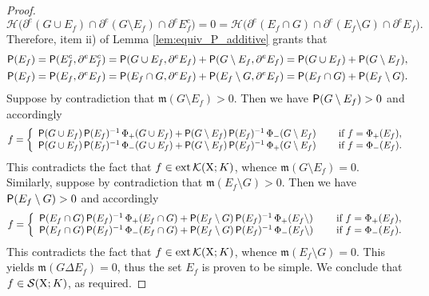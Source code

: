 \documentclass[reqno]{amsart}
\numberwithin{equation}{section}
\newcommand{\X}{{\rm X}}
\newcommand{\mm}{\mathfrak m}
\newcommand{\1}{\mathbbm 1}
\renewcommand{\P}{{\sf P}}
\renewcommand{\H}{{\mathcal H}}
\begin{document}
\begin{proof}
\[
\H\big(\partial^e(G\cup E_f)\cap\partial^e(G\setminus E_f)\cap\partial^e E_f^c\big)
=0=\H\big(\partial^e(E_f\cap G)\cap\partial^e(E_f\setminus G)\cap\partial^e E_f\big).
\]
Therefore, item ii) of Lemma \ref{lem:equiv_P_additive} grants that
\[\begin{split}
\P(E_f)&=\P(E_f^c,\partial^e E_f^c)=
\P(G\cup E_f,\partial^e E_f)+\P(G\setminus E_f,\partial^e E_f)
=\P(G\cup E_f)+\P(G\setminus E_f),\\
\P(E_f)&=\P(E_f,\partial^e E_f)=
\P(E_f\cap G,\partial^e E_f)+\P(E_f\setminus G,\partial^e E_f)
=\P(E_f\cap G)+\P(E_f\setminus G).
\end{split}\]
Suppose by contradiction that \(\mm(G\setminus E_f)>0\). Then
we have \(\P(G\setminus E_f)>0\) and accordingly
\[
f=\left\{\begin{array}{ll}
\P(G\cup E_f)\,\P(E_f)^{-1}\,\Phi_+(G\cup E_f)+
\P(G\setminus E_f)\,\P(E_f)^{-1}\,\Phi_-(G\setminus E_f)\\
\P(G\cup E_f)\,\P(E_f)^{-1}\,\Phi_-(G\cup E_f)+
\P(G\setminus E_f)\,\P(E_f)^{-1}\,\Phi_+(G\setminus E_f)
\end{array}\quad\begin{array}{ll}
\text{ if }f=\Phi_+(E_f),\\
\text{ if }f=\Phi_-(E_f).
\end{array}\right.
\]
This contradicts the fact that \(f\in{\rm ext}\,\mathcal K(\X;K)\),
whence \(\mm(G\setminus E_f)=0\). Similarly, suppose by contradiction
that \(\mm(E_f\setminus G)>0\). Then we have \(\P(E_f\setminus G)>0\) and accordingly
\[
f=\left\{\begin{array}{ll}
\P(E_f\cap G)\,\P(E_f)^{-1}\,\Phi_+(E_f\cap G)+
\P(E_f\setminus G)\,\P(E_f)^{-1}\,\Phi_+(E_f\setminus)\\
\P(E_f\cap G)\,\P(E_f)^{-1}\,\Phi_-(E_f\cap G)+
\P(E_f\setminus G)\,\P(E_f)^{-1}\,\Phi_-(E_f\setminus)
\end{array}\quad\begin{array}{ll}
\text{ if }f=\Phi_+(E_f),\\
\text{ if }f=\Phi_-(E_f).
\end{array}\right.
\]
This contradicts the fact that \(f\in{\rm ext}\,\mathcal K(\X;K)\),
whence \(\mm(E_f\setminus G)=0\). This yields \(\mm(G\Delta E_f)=0\),
thus the set \(E_f\) is proven to be simple. We conclude that \(f\in\mathcal S(\X;K)\),
as required.
\end{proof}
%
%
\end{document}

